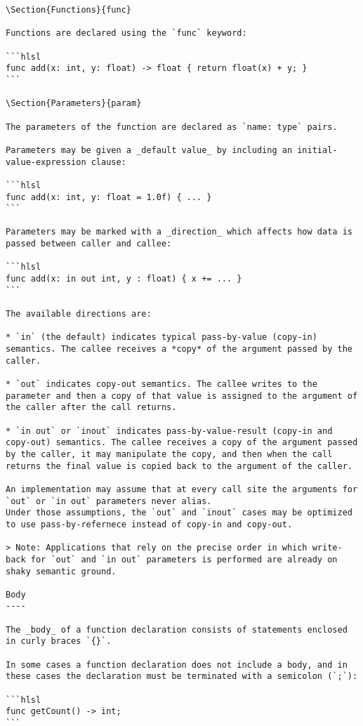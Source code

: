 \begin{verbatim}
\Section{Functions}{func}

Functions are declared using the `func` keyword:

```hlsl
func add(x: int, y: float) -> float { return float(x) + y; }
```

\Section{Parameters}{param}

The parameters of the function are declared as `name: type` pairs.

Parameters may be given a _default value_ by including an initial-value-expression clause:

```hlsl
func add(x: int, y: float = 1.0f) { ... }
```

Parameters may be marked with a _direction_ which affects how data is passed between caller and callee:

```hlsl
func add(x: in out int, y : float) { x += ... }
```

The available directions are:

* `in` (the default) indicates typical pass-by-value (copy-in) semantics. The callee receives a *copy* of the argument passed by the caller.

* `out` indicates copy-out semantics. The callee writes to the parameter and then a copy of that value is assigned to the argument of the caller after the call returns.

* `in out` or `inout` indicates pass-by-value-result (copy-in and copy-out) semantics. The callee receives a copy of the argument passed by the caller, it may manipulate the copy, and then when the call returns the final value is copied back to the argument of the caller.

An implementation may assume that at every call site the arguments for `out` or `in out` parameters never alias.
Under those assumptions, the `out` and `inout` cases may be optimized to use pass-by-refernece instead of copy-in and copy-out.

> Note: Applications that rely on the precise order in which write-back for `out` and `in out` parameters is performed are already on shaky semantic ground.

Body
----

The _body_ of a function declaration consists of statements enclosed in curly braces `{}`.

In some cases a function declaration does not include a body, and in these cases the declaration must be terminated with a semicolon (`;`):

```hlsl
func getCount() -> int;
```


\end{verbatim}
